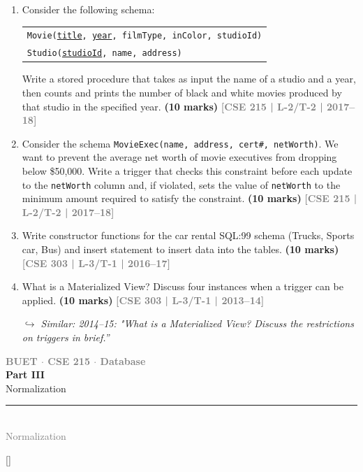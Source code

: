 \documentclass[12pt]{article}
\newcommand{\yr}[1]{\hfill\textcolor{gray}{\small\textbf{[#1]}}}
\newcommand{\mk}[1]{\textcolor{orange!70!black}{\small\textbf{(#1 marks)}}}
\newcommand{\variant}[1]{\par\vspace{1pt}\textcolor{blue!50!black}%
  {\footnotesize\textit{$\hookrightarrow$ Similar: #1}}}
\newcommand{\secdivider}[4]{%
  \newpage\thispagestyle{empty}%
  \vspace*{\fill}%
  \begin{tcolorbox}[enhanced,colback=#4!7,colframe=#3,boxrule=1.5pt,arc=8pt,
    left=20pt,right=20pt,top=22pt,bottom=22pt,
    shadow={3pt}{-3pt}{0pt}{black!15}]
    \centering
    {\large\textcolor{gray}{\textbf{BUET $\cdot$ CSE 215 $\cdot$ Database}}}\\[8pt]
    {\fontsize{26}{32}\selectfont\bfseries\textcolor{#3}{#1}}\\[6pt]
    {\fontsize{15}{19}\selectfont\textcolor{dgray}{#2}}\\[12pt]
    \textcolor{#3!60}{\rule{0.5\textwidth}{0.5pt}}\\[6pt]
    {\small\textcolor{gray}{#2}}
  \end{tcolorbox}%
  \vspace*{\fill}\newpage%
}
\begin{document}
\begin{enumerate}
\begin{center}
\end{center}


\mk{10} \yr{CSE 215 | L-2/T-2 | 2018--19}


\item Consider the following schema:
\begin{center}
\begin{tabular}{l}
\texttt{Movie(\underline{title}, \underline{year}, filmType, inColor, studioId)}\\
\texttt{Studio(\underline{studioId}, name, address)}
\end{tabular}
\end{center}
Write a stored procedure that takes as input the name of a studio and a year, then counts and prints the number of black and white movies produced by that studio in the specified year.
\mk{10} \yr{CSE 215 | L-2/T-2 | 2017--18}


\item Consider the schema \texttt{MovieExec(name, address, cert\#, netWorth)}. We want to prevent the average net worth of movie executives from dropping below \$50,000. Write a trigger that checks this constraint before each update to the \texttt{netWorth} column and, if violated, sets the value of \texttt{netWorth} to the minimum amount required to satisfy the constraint.
\mk{10} \yr{CSE 215 | L-2/T-2 | 2017--18}


\item Write constructor functions for the car rental SQL:99 schema (Trucks, Sports car, Bus) and insert statement to insert data into the tables.
\mk{10} \yr{CSE 303 | L-3/T-1 | 2016--17}


\item What is a Materialized View? Discuss four instances when a trigger can be applied.
\mk{10} \yr{CSE 303 | L-3/T-1 | 2013--14}
\variant{2014--15: "What is a Materialized View? Discuss the restrictions on triggers in brief.''}


\end{enumerate}


\secdivider{Part III}{Normalization}{cC}{cC}
\titleformat{\section}{\large\bfseries\color{cC}}{}{0em}{}[\titlerule]
\end{document}

